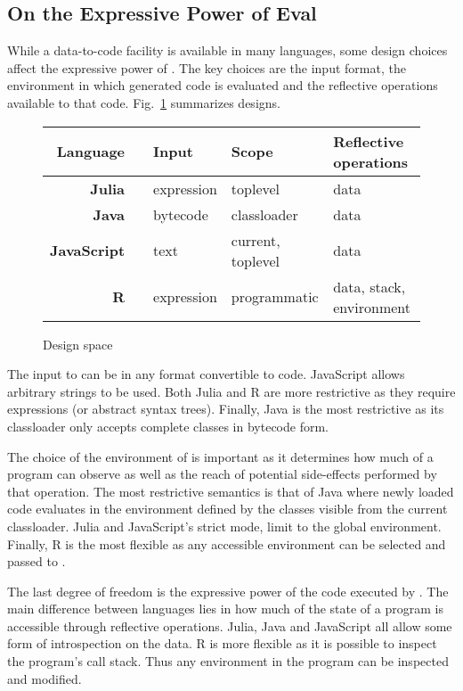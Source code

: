 \documentclass[screen,acmsmall]{acmart}
\begin{document}
\subsection{On the Expressive Power of Eval}

While a data-to-code facility is available in many languages, some design
choices affect the expressive power of \eval. The key choices are the input
format, the environment in which generated code is evaluated and the reflective
operations available to that code. Fig.~\ref{comp} summarizes designs.

\begin{figure}[!h]\center\small\begin{tabular}{r@{~}l|l|l|l}\hline
\tiny\sc Language&&\sc\tiny Input&\sc\tiny Scope&\tiny\sc Reflective operations\\\hline
\bf Julia&\cite{julia}     & expression& toplevel         & data\\
\bf Java&\cite{cl}  & bytecode  & classloader       & data\\
\bf JavaScript&\cite{ecoop11}& text      & current, toplevel& data\\
\bf R&\cite{R96}  & expression& programmatic      & data, stack, environment\\\hline
\end{tabular}\caption{Design space}\label{comp}
\end{figure}

The input to \eval can be in any format convertible to code. JavaScript allows
arbitrary strings to be used. Both Julia and R are more restrictive as they
require expressions (or abstract syntax trees). Finally, Java is the most
restrictive as its classloader only accepts complete classes in bytecode form.

The choice of the environment of \eval is important as it determines how much of
a program \eval can observe as well as the reach of potential side-effects
performed by that operation. The most restrictive semantics is that of Java
where newly loaded code evaluates in the environment defined by the classes
visible from the current classloader. Julia and JavaScript's strict mode, limit
\eval to the global environment. Finally, R is the most flexible as any
accessible environment can be selected and passed to \eval.

The last degree of freedom is the expressive power of the code executed by
\eval. The main difference between languages lies in how much of the state of a
program is accessible through reflective operations. Julia, Java and JavaScript
all allow some form of introspection on the data. R is more flexible as it is
possible to inspect the program's call stack. Thus any environment in the
program can be inspected and modified.
\end{document}
